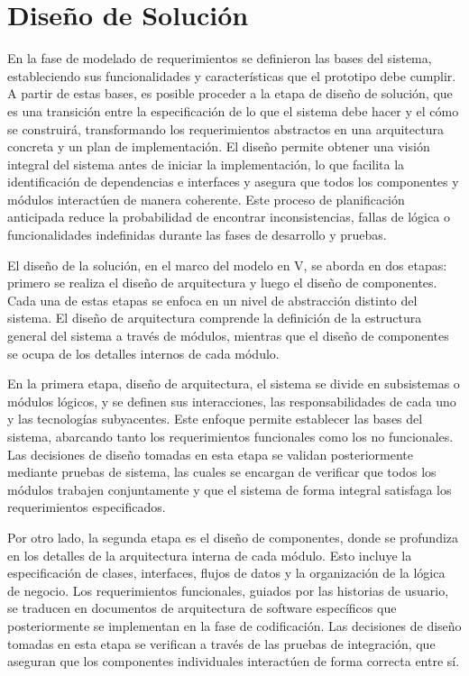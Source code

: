 \chapter[Diseño de Solución]{Diseño de Solución}
\label{cp:design}

\parindent0pt

En la fase de modelado de requerimientos se definieron las bases del sistema, estableciendo sus funcionalidades y características que el prototipo debe cumplir. A partir de estas bases, es posible proceder a la etapa de diseño de solución, que es una transición entre la especificación de lo que el sistema debe hacer y el cómo se construirá, transformando los requerimientos abstractos en una arquitectura concreta y un plan de implementación. El diseño permite obtener una visión integral del sistema antes de iniciar la implementación, lo que facilita la identificación de dependencias e interfaces y asegura que todos los componentes y módulos interactúen de manera coherente. Este proceso de planificación anticipada reduce la probabilidad de encontrar inconsistencias, fallas de lógica o funcionalidades indefinidas durante las fases de desarrollo y pruebas.

El diseño de la solución, en el marco del modelo en V, se aborda en dos etapas: primero se realiza el diseño de arquitectura y luego el diseño de componentes. Cada una de estas etapas se enfoca en un nivel de abstracción distinto del sistema. El diseño de arquitectura comprende la definición de la estructura general del sistema a través de módulos, mientras que el diseño de componentes se ocupa de los detalles internos de cada módulo.

En la primera etapa, diseño de arquitectura, el sistema se divide en subsistemas o módulos lógicos, y se definen sus interacciones, las responsabilidades de cada uno y las tecnologías subyacentes. Este enfoque permite establecer las bases del sistema, abarcando tanto los requerimientos funcionales como los no funcionales. Las decisiones de diseño tomadas en esta etapa se validan posteriormente mediante pruebas de sistema, las cuales se encargan de verificar que todos los módulos trabajen conjuntamente y que el sistema de forma integral satisfaga los requerimientos especificados.

Por otro lado, la segunda etapa es el diseño de componentes, donde se profundiza en los detalles de la arquitectura interna de cada módulo. Esto incluye la especificación de clases, interfaces, flujos de datos y la organización de la lógica de negocio. Los requerimientos funcionales, guiados por las historias de usuario, se traducen en documentos de arquitectura de \gls{software} específicos que posteriormente se implementan en la fase de codificación. Las decisiones de diseño tomadas en esta etapa se verifican a través de las pruebas de integración, que aseguran que los componentes individuales interactúen de forma correcta entre sí.

